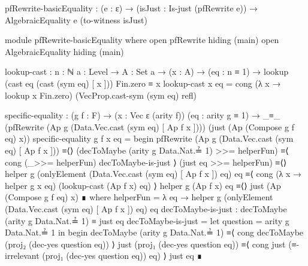 \documentclass{report}
\begin{document}
\begin{code}
    pfRewrite-basicEquality :
      (e : ε) →
      (isJust : Is-just (pfRewrite e)) →
      AlgebraicEquality e (to-witness isJust)

    module pfRewrite-basicEquality where
      open pfRewrite hiding (main)
      open AlgebraicEquality hiding (main)

      lookup-cast :
        {n : ℕ}
        {a : Level} →
        {A : Set a} →
        (x : A) →
        (eq : n ≡ 1) →
        lookup (cast eq (cast (sym eq) [ x ])) Fin.zero ≡ x
      lookup-cast x eq = cong (λ x → lookup x Fin.zero)
                              (VecProp.cast-sym (sym eq) refl)

      specific-equality :
        (g f : F) →
        (x : Vec ε (arity f))
        (eq : arity g ≡ 1) →
        _≡_ (pfRewrite (Ap g (Data.Vec.cast (sym eq) [ Ap f x ])))
            (just (Ap (Compose g f eq) x))
      specific-equality g f x eq = begin
        pfRewrite (Ap g (Data.Vec.cast (sym eq) [ Ap f x ]))
          ≡⟨⟩
        (decToMaybe (arity g Data.Nat.≟ 1) >>= helperFun)
          ≡⟨ cong (_>>= helperFun) decToMaybe-is-just ⟩
        (just eq >>= helperFun)
          ≡⟨⟩
        helper g (onlyElement (Data.Vec.cast (sym eq) [ Ap f x ]) eq) eq
          ≡⟨ cong (λ x → helper g x eq) (lookup-cast (Ap f x) eq) ⟩
        helper g (Ap f x) eq
          ≡⟨⟩
        just (Ap (Compose g f eq) x) ∎
        where
        helperFun =
          λ eq → helper g
                        (onlyElement (Data.Vec.cast (sym eq)
                                                    [ Ap f x ])
                                     eq)
                        eq
        decToMaybe-is-just : decToMaybe (arity g Data.Nat.≟ 1) ≡ just eq
        decToMaybe-is-just = let question = arity g Data.Nat.≟ 1 in begin
          decToMaybe (arity g Data.Nat.≟ 1)
            ≡⟨ cong decToMaybe (proj₂ (dec-yes question eq)) ⟩
          just (proj₁ (dec-yes question eq))
            ≡⟨ cong just (≡-irrelevant (proj₁ (dec-yes question eq)) eq) ⟩
          just eq ∎


\end{code}
\end{document}
